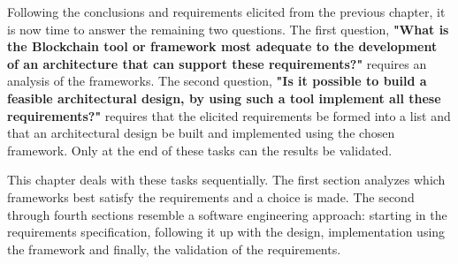 
Following the conclusions and requirements elicited from the previous chapter, it is now time to answer the remaining two questions. The first question, \textbf{"What is the Blockchain tool or framework most adequate to the development of an architecture that can support these requirements?"} requires an analysis of the frameworks. The second question, \textbf{"Is it possible to build a feasible architectural design, by using such a tool implement all these requirements?"} requires that the elicited requirements be formed into a list and that an architectural design be built and implemented using the chosen framework. Only at the end of these tasks can the results be validated. 

This chapter deals with these tasks sequentially. The first section analyzes which frameworks best satisfy the requirements and a choice is made. The second through fourth sections resemble a software engineering approach: starting in the requirements specification, following it up with the design, implementation using the framework and finally, the validation of the requirements.